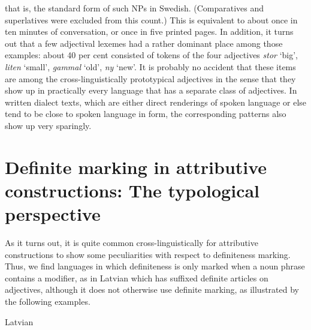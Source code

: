 \begin{styleBodyTextFirst}
that is, the standard form of such NPs in Swedish. (Comparatives and superlatives were excluded from this count.) This is equivalent to about once in ten minutes of conversation, or once in five printed pages. In addition, it turns out that a few adjectival lexemes had a rather dominant place among those examples: about 40 per cent consisted of tokens of the four adjectives \textit{stor }‘big’, \textit{liten} ‘small’, \textit{gammal} ‘old’, \textit{ny} ‘new’. It is probably no accident that these items are among the cross-linguistically prototypical adjectives in the sense that they show up in practically every language that has a separate class of adjectives. In written dialect texts, which are either direct renderings of spoken language or else tend to be close to spoken language in form, the corresponding patterns also show up very sparingly.

\end{styleBodyTextFirst}

\section{Definite marking in attributive constructions: The typological perspective}

\begin{styleBodyTextFirst}
As it turns out, it is quite common cross-linguistically for attributive constructions to show some peculiarities with respect to definiteness marking. Thus, we find languages in which definiteness is only marked when a noun phrase contains a modifier, as in Latvian which has suffixed definite articles on adjectives, although it does not otherwise use definite marking, as illustrated by the following examples. 

\end{styleBodyTextFirst}

\begin{listWWNumileveli}
\item {}

\begin{styleExample}
Latvian

\end{styleExample}

\end{listWWNumileveli}

\begin{listWWNumlviiileveli}
\item {}

\end{listWWNumlviiileveli}

